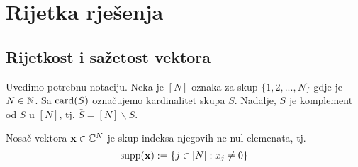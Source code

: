 \documentclass[a4paper,twoside,12pt]{memoir} %
\newcommand{\vect}[1]{\mathbf{#1}}
\renewcommand{\vec}{\vect}
\newcommand{\card}{\text{\normalfont{card}}}
\newcommand{\supp}{\text{\normalfont{supp}}}
\begin{document}
\chapter[Rijetka rje\v{s}enja][Rijetka rje\v{s}enja]{Rijetka rje\v{s}enja}\label{chapter_rijetka_rijesenja}	

\section[Rijetkost i sa\v{z}etost vektora][Rijetkost i sa\v{z}etost vektora]{Rijetkost i sa\v{z}etost vektora}
Uvedimo potrebnu notaciju. Neka je $[N]$ oznaka za skup $\{1,2,...,N\}$ gdje je $N\in\mathbb{N}$. Sa $\card(S)$ ozna\v{c}ujemo kardinalitet skupa $S$. Nadalje, $\bar{S}$ je komplement od $S$ u $[N]$, tj. $\bar{S}=[N]\backslash S$.

\begin{defn}
    Nosa\v{c} vektora $\vec{x} \in \C^{N}$ je skup indeksa njegovih ne-nul elemenata, tj.
    $$\supp(\vec{x}):=\{j\in[N]:x_j \neq 0 \}$$
\end{defn}
\end{document}
